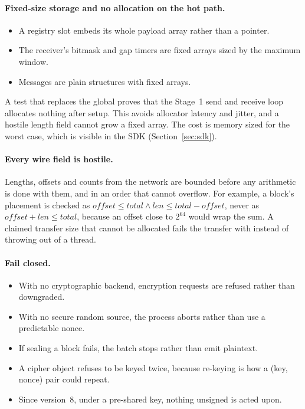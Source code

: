 \paragraph{Fixed-size storage and no allocation on the hot path.}
\begin{itemize}
  \item A registry slot embeds its whole payload array rather than a pointer.
  \item The receiver's bitmask and gap timers are fixed arrays sized by the maximum window.
  \item Messages are plain structures with fixed arrays.
\end{itemize}
A test that replaces the global  proves that the Stage~1 send and receive loop allocates
nothing after setup. This avoids allocator latency and jitter, and a hostile length field cannot grow a fixed
array. The cost is memory sized for the worst case, which is visible in the SDK (Section~\ref{sec:sdk}).

\paragraph{Every wire field is hostile.} Lengths, offsets and counts from the network are bounded before any
arithmetic is done with them, and in an order that cannot overflow. For example, a block's placement is checked
as $\mathit{offset}\le\mathit{total} \wedge \mathit{len}\le\mathit{total}-\mathit{offset}$, never as
$\mathit{offset}+\mathit{len}\le\mathit{total}$, because an offset close to $2^{64}$ would wrap the sum. A claimed
transfer size that cannot be allocated fails the transfer with  instead of throwing out of a
thread.

\paragraph{Fail closed.}
\begin{itemize}
  \item With no cryptographic backend, encryption requests are refused rather than downgraded.
  \item With no secure random source, the process aborts rather than use a predictable nonce.
  \item If sealing a block fails, the batch stops rather than emit plaintext.
  \item A cipher object refuses to be keyed twice, because re-keying is how a (key, nonce) pair could repeat.
  \item Since version~8, under a pre-shared key, nothing unsigned is acted upon.
\end{itemize}

